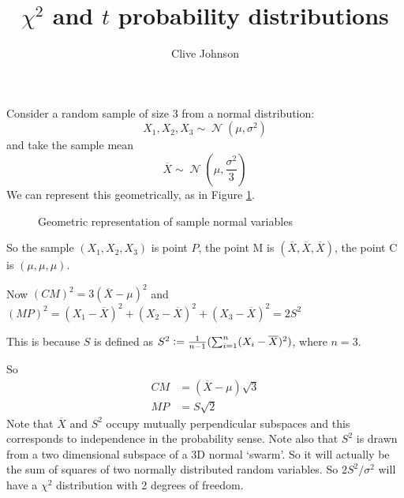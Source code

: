 \documentclass[fleqn,a4paper,11pt]{article}
\title{\(\chi^2\) and \(t\) probability distributions}
\author{Clive Johnson}
\DeclareMathOperator{\Normal}{\mathcal N}
\newcommand{\defeq}{\vcentcolon=}
\newcommand*\mean[1]{\overline{#1}}
\newcommand*\lseg[1]{\mathit{#1}}
\begin{document}
\maketitle

Consider a random sample of size \(3\) from a normal distribution:
\begin{equation*}
X_1,X_2,X_3 \sim \Normal(\mu, \sigma^2)
\end{equation*}
and take the sample mean
\begin{equation*}
\mean X \sim \Normal(\mu, \frac{\sigma^2}{3})
\end{equation*}
We can represent this geometrically, as in Figure \ref{fig_1}.

\begin{figure}[h]
\begin{center}
\end{center}
\caption{Geometric representation of sample normal variables}
\label{fig_1}
\end{figure}

So the sample \((X_1, X_2, X_3)\) is point \(P\), the point M is
\((\mean X, \mean X, \mean X)\), the point C is
\((\mu, \mu, \mu)\).

Now \((\lseg{CM})^2 = 3(\mean X - \mu)^2\) and \\
\((\lseg{MP})^2 =
  (X_1 - \mean X)^2 + (X_2 - \mean X)^2 + (X_3 - \mean X)^2 =
  2S^2\)

This is because \(S\) is defined as
\(S^2 \defeq \frac 1{n - 1}(\sum_{i=1}^n(X_i - \mean X)^2)\), where \(n = 3\).

So
\begin{align*}
\lseg{CM} &= (\mean X - \mu)\sqrt 3 \\
\lseg{MP} &= S \sqrt 2
\end{align*}
Note that \(\mean X\) and \(S^2\) occupy mutually perpendicular subspaces
and this corresponds to independence in the probability sense. Note also that
\(S^2\) is drawn from a two dimensional subspace of a 3D normal `swarm'. So it
will actually be the sum of squares of two normally distributed random
variables. So \(2S^2/\sigma^2\) will have a \(\chi^2\) distribution with 2
degrees of freedom.
\end{document}
